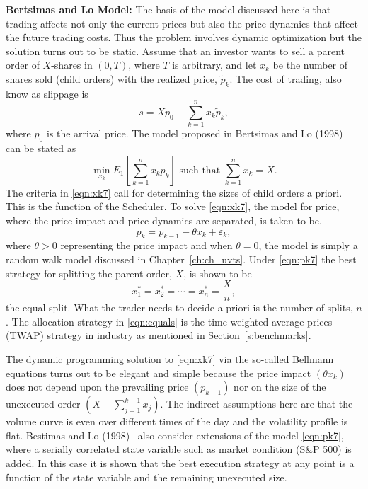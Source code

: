 \noindent\textbf{Bertsimas and Lo Model:} The basis of the model discussed here is that trading affects not only the current prices but also the price dynamics that affect the future trading costs. Thus the problem involves dynamic optimization but the solution turns out to be static. Assume that an investor wants to sell a parent order of $X$-shares in $(0,T)$, where $T$ is arbitrary, and let $x_k$ be the number of shares sold (child orders) with the realized price, $\widetilde{p}_k$. The cost of trading, also know as slippage is
	\begin{equation} \label{eqn:x7}
	s= Xp_0 - \sum_{k=1}^n x_k\widetilde{p}_k,
	\end{equation}
where $p_0$ is the arrival price. The model proposed in Bertsimas and Lo (1998)~\cite{berlo} can be stated as
	\begin{equation} \label{eqn:xk7}
	\min_{x_k} E_1 \left[\sum_{k=1}^n x_kp_k\right] \text{ such that }\sum_{k=1}^n x_k=X.
	\end{equation}
The criteria in \eqref{eqn:xk7} call for determining the sizes of child orders a priori. This is the function of the Scheduler. To solve \eqref{eqn:xk7}, the model for price, where the price impact and price dynamics are separated, is taken to be,
	\begin{equation} \label{eqn:pk7}
	p_k = p_{k-1} - \theta x_k + \varepsilon_k,
	\end{equation}
where $\theta > 0$ representing the price impact and when $\theta = 0$, the model is simply a random walk model discussed in Chapter~\ref{ch:ch_uvts}. Under \eqref{eqn:pk7} the best strategy for splitting the parent order, $X$, is shown to be
	\begin{equation} \label{eqn:equals}
	x_1^* = x_2^* = \cdots = x_n^* = \frac{X}{n},
	\end{equation}
the equal split. What the trader needs to decide a priori is the number of splits, $n$. The allocation strategy in \eqref{eqn:equals} is the time weighted average prices (TWAP) strategy in industry as mentioned in Section~\ref{s:benchmarks}.


The dynamic programming solution to \eqref{eqn:xk7} via the so-called Bellmann equations turns out to be elegant and simple because the price impact $(\theta x_k)$ does not depend upon the prevailing price $(p_{k-1})$ nor on the size of the unexecuted order $(X - \sum_{j=1}^{k-1} x_j)$. The indirect assumptions here are that the volume curve is even over different times of the day and the volatility profile is flat. Bestimas and Lo (1998)~\cite{berlo} also consider extensions of the model \eqref{eqn:pk7}, where a serially correlated state variable such as market condition (S\&P 500) is added. In this case it is shown that the best execution strategy at any point is a function of the state variable and the remaining unexecuted size. 


